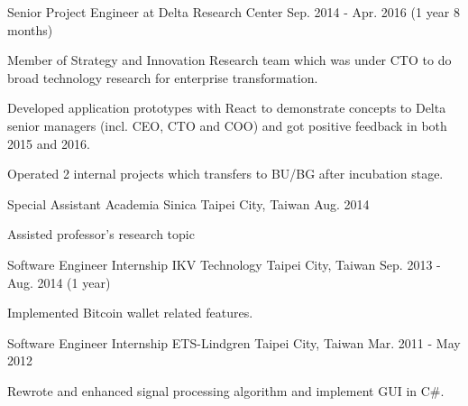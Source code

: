 \begin{cventries}
  \cventry
    {Senior Project Engineer at Delta Research Center} %
    {} %
    {} %
    {Sep. 2014 - Apr. 2016 (1 year 8 months)} %
    {
      \begin{cvitems} %
        \item {Member of Strategy and Innovation Research team which was under CTO to do broad technology research for enterprise transformation.}
        \item {Developed application prototypes with React to demonstrate concepts to Delta senior managers (incl. CEO, CTO and COO) and got positive feedback in both 2015 and 2016.}
        \item {Operated 2 internal projects which transfers to BU/BG after incubation stage. }
      \end{cvitems}
    }

  \cventry
    {Special Assistant} %
    {Academia Sinica} %
    {Taipei City, Taiwan} %
    {Aug. 2014} %
    {
      \begin{cvitems} %
        \item {Assisted professor's research topic}
      \end{cvitems}
    }

  \cventry
    {Software Engineer Internship} %
    {IKV Technology} %
    {Taipei City, Taiwan} %
    {Sep. 2013 - Aug. 2014 (1 year)} %
    {
      \begin{cvitems} %
        \item {Implemented Bitcoin wallet related features.}
      \end{cvitems}
    }

  \cventry
    {Software Engineer Internship} %
    {ETS-Lindgren} %
    {Taipei City, Taiwan} %
    {Mar. 2011 - May 2012} %
    {
      \begin{cvitems} %
        \item {Rewrote and enhanced signal processing algorithm and implement GUI in C\#.}
      \end{cvitems}
    }
\end{cventries}
